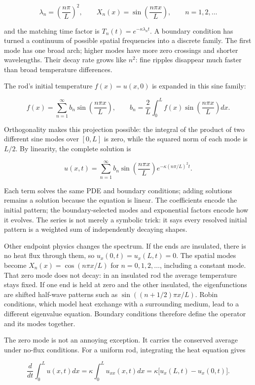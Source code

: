 \[
\lambda_n=\left(\frac{n\pi}{L}\right)^2,
\qquad
X_n(x)=\sin\left(\frac{n\pi x}{L}\right),
\qquad n=1,2,\ldots
\]

and the matching time factor is \(T_n(t)=e^{-\kappa\lambda_nt}\). A boundary condition has turned a continuum of possible spatial frequencies into a discrete family. The first mode has one broad arch; higher modes have more zero crossings and shorter wavelengths. Their decay rate grows like \(n^2\): fine ripples disappear much faster than broad temperature differences.

The rod's initial temperature \(f(x)=u(x,0)\) is expanded in this sine family:

\[
f(x)=\sum_{n=1}^{\infty}b_n\sin\left(\frac{n\pi x}{L}\right),
\qquad
b_n=\frac{2}{L}\int_0^L f(x)\sin\left(\frac{n\pi x}{L}\right)dx.
\]

Orthogonality makes this projection possible: the integral of the product of two different sine modes over \([0,L]\) is zero, while the squared norm of each mode is \(L/2\). By linearity, the complete solution is

\[
u(x,t)=\sum_{n=1}^{\infty}b_n\sin\left(\frac{n\pi x}{L}\right)e^{-\kappa(n\pi/L)^2t}.
\]

Each term solves the same PDE and boundary conditions; adding solutions remains a solution because the equation is linear. The coefficients encode the initial pattern; the boundary-selected modes and exponential factors encode how it evolves. The series is not merely a symbolic trick: it says every resolved initial pattern is a weighted sum of independently decaying shapes.

Other endpoint physics changes the spectrum. If the ends are insulated, there is no heat flux through them, so \(u_x(0,t)=u_x(L,t)=0\). The spatial modes become \(X_n(x)=\cos(n\pi x/L)\) for \(n=0,1,2,\ldots\), including a constant mode. That zero mode does not decay: in an insulated rod the average temperature stays fixed. If one end is held at zero and the other insulated, the eigenfunctions are shifted half-wave patterns such as \(\sin((n+1/2)\pi x/L)\). Robin conditions, which model heat exchange with a surrounding medium, lead to a different eigenvalue equation. Boundary conditions therefore define the operator and its modes together.

The zero mode is not an annoying exception. It carries the conserved average under no-flux conditions. For a uniform rod, integrating the heat equation gives

\[
\frac{d}{dt}\int_0^L u(x,t)dx
=\kappa\int_0^L u_{xx}(x,t)dx
=\kappa\big[u_x(L,t)-u_x(0,t)\big].
\]

